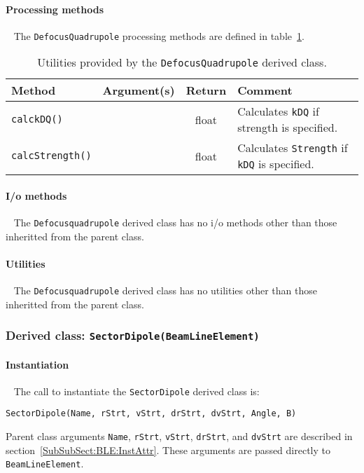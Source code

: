 \paragraph{Processing methods} ~\newline
\noindent
The \texttt{DefocusQuadrupole} processing methods are defined in
table~\ref{Tab:DQuad:Methods}.
\begin{table}[h]
  \caption{
    Utilities provided by the \texttt{DefocusQuadrupole} derived
    class. 
  }
  \label{Tab:DQuad:Methods}
  \begin{center}
    \begin{tabular}{|l|c|c|p{7cm}|}
      \hline
      \textbf{Method} & \textbf{Argument(s)} & \textbf{Return} & \textbf{Comment}                     \\
      \hline
      \texttt{calckDQ()} &  & float & Calculates \texttt{kDQ} if strength is specified.               \\
      \texttt{calcStrength()} &  & float & Calculates \texttt{Strength} if \texttt{kDQ} is specified. \\
      \hline
    \end{tabular}
  \end{center}
\end{table}

\paragraph{I/o methods} ~\newline
\noindent
The \texttt{Defocusquadrupole} derived class has no i/o methods other
than those inheritted from the parent class.

\paragraph{Utilities} ~\newline
\noindent
The \texttt{Defocusquadrupole} derived class has no utilities other
than those inheritted from the parent class. 

\FloatBarrier

\subsubsection{Derived class: \texttt{SectorDipole(BeamLineElement)}}

\paragraph{Instantiation} ~\newline
\noindent
The call to instantiate the \texttt{SectorDipole} derived class is:
\begin{center}
  \texttt{SectorDipole(Name, rStrt, vStrt, drStrt, dvStrt, 
          Angle, B)} 
\end{center}
Parent class arguments \texttt{Name}, \texttt{rStrt}, \texttt{vStrt},
\texttt{drStrt}, and \texttt{dvStrt} are described in
section~\ref{SubSubSect:BLE:InstAttr}.
These arguments are passed directly to \texttt{BeamLineElement}.


